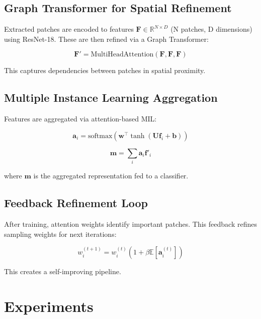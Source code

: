 \documentclass[runningheads]{llncs}
\begin{document}
\subsection{Graph Transformer for Spatial Refinement}

\label{sec:graph_transformer}

Extracted patches are encoded to features $\mathbf{F} \in \mathbb{R}^{N \times D}$ (N patches, D dimensions) using ResNet-18. These are then refined via a Graph Transformer:

\begin{equation}
\mathbf{F}' = \text{MultiHeadAttention}(\mathbf{F}, \mathbf{F}, \mathbf{F})
\end{equation}

This captures dependencies between patches in spatial proximity.

\subsection{Multiple Instance Learning Aggregation}

\label{sec:mil}

Features are aggregated via attention-based MIL:

\begin{equation}
\mathbf{a}_i = \text{softmax}(\mathbf{w}^\top \tanh(\mathbf{U} \mathbf{f}_i + \mathbf{b}))
\end{equation}

\begin{equation}
\mathbf{m} = \sum_i \mathbf{a}_i \mathbf{f}'_i
\end{equation}

where $\mathbf{m}$ is the aggregated representation fed to a classifier.

\subsection{Feedback Refinement Loop}

\label{sec:feedback}

After training, attention weights identify important patches. This feedback refines sampling weights for next iterations:

\begin{equation}
w_i^{(t+1)} = w_i^{(t)} (1 + \beta \mathbb{E}[\mathbf{a}_i^{(t)}])
\end{equation}

This creates a self-improving pipeline.

\section{Experiments}
\end{document}
